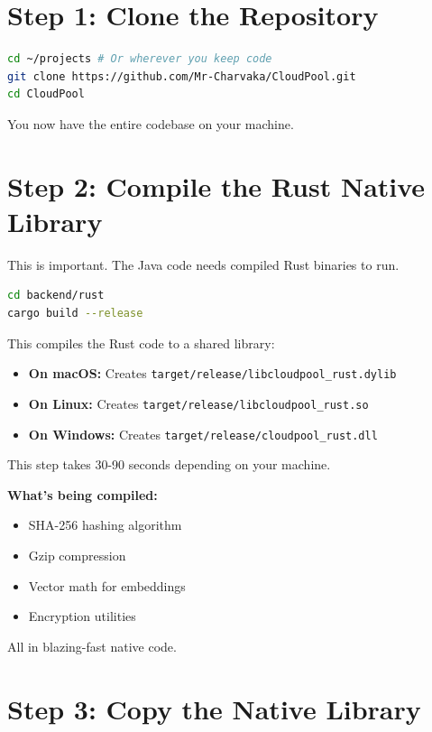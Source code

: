 \documentclass[11pt,a4paper]{report}
\begin{document}
\section{Step 1: Clone the Repository}


\begin{lstlisting}[language=bash]
cd ~/projects # Or wherever you keep code
git clone https://github.com/Mr-Charvaka/CloudPool.git
cd CloudPool
\end{lstlisting}

You now have the entire codebase on your machine.


\section{Step 2: Compile the Rust Native Library}


This is important. The Java code needs compiled Rust binaries to run.

\begin{lstlisting}[language=bash]
cd backend/rust
cargo build --release
\end{lstlisting}

This compiles the Rust code to a shared library:
\begin{itemize}
\item \textbf{On macOS:} Creates \texttt{target/release/libcloudpool\_rust.dylib}
\item \textbf{On Linux:} Creates \texttt{target/release/libcloudpool\_rust.so}
\item \textbf{On Windows:} Creates \texttt{target/release/cloudpool\_rust.dll}

\end{itemize}
This step takes 30-90 seconds depending on your machine.

\textbf{What's being compiled:}
\begin{itemize}
\item SHA-256 hashing algorithm
\item Gzip compression
\item Vector math for embeddings
\item Encryption utilities

\end{itemize}
All in blazing-fast native code.


\section{Step 3: Copy the Native Library}
\end{document}
